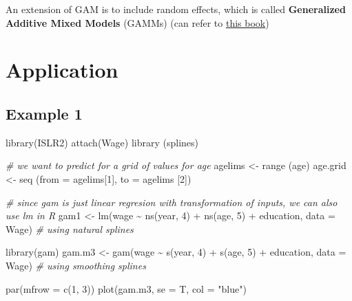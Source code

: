 \documentclass[
]{book}
\newenvironment{Shaded}{\begin{snugshade}}{\end{snugshade}}
\newcommand{\AttributeTok}[1]{\textcolor[rgb]{0.77,0.63,0.00}{#1}}
\newcommand{\CommentTok}[1]{\textcolor[rgb]{0.56,0.35,0.01}{\textit{#1}}}
\newcommand{\DecValTok}[1]{\textcolor[rgb]{0.00,0.00,0.81}{#1}}
\newcommand{\FunctionTok}[1]{\textcolor[rgb]{0.00,0.00,0.00}{#1}}
\newcommand{\NormalTok}[1]{#1}
\newcommand{\OtherTok}[1]{\textcolor[rgb]{0.56,0.35,0.01}{#1}}
\newcommand{\SpecialCharTok}[1]{\textcolor[rgb]{0.00,0.00,0.00}{#1}}
\newcommand{\StringTok}[1]{\textcolor[rgb]{0.31,0.60,0.02}{#1}}
\begin{document}
An extension of GAM is to include random effects, which is called \textbf{Generalized Additive Mixed Models} (GAMMs) (can refer to \href{https://highstat.com/index.php/beginner-s-guide-to-generalized-additive-models-with-r}{this book})

\hypertarget{application-2}{%
\section{Application}\label{application-2}}

\hypertarget{example-1-1}{%
\subsection{Example 1}\label{example-1-1}}

\citep[7.8]{james2013}

\begin{Shaded}
\begin{Highlighting}[]
\FunctionTok{library}\NormalTok{(ISLR2)}
\FunctionTok{attach}\NormalTok{(Wage)}
\FunctionTok{library}\NormalTok{ (splines)}

\CommentTok{\# we want to predict for a grid of values for age }
\NormalTok{agelims }\OtherTok{\textless{}{-}} \FunctionTok{range}\NormalTok{ (age)}
\NormalTok{age.grid }\OtherTok{\textless{}{-}} \FunctionTok{seq}\NormalTok{ (}\AttributeTok{from =}\NormalTok{ agelims[}\DecValTok{1}\NormalTok{], }\AttributeTok{to =}\NormalTok{ agelims [}\DecValTok{2}\NormalTok{])}

\CommentTok{\# since gam is just linear regresion with transformation of inputs, we can also use lm in R}
\NormalTok{gam1 }\OtherTok{\textless{}{-}} \FunctionTok{lm}\NormalTok{(wage }\SpecialCharTok{\textasciitilde{}} \FunctionTok{ns}\NormalTok{(year, }\DecValTok{4}\NormalTok{) }\SpecialCharTok{+} \FunctionTok{ns}\NormalTok{(age, }\DecValTok{5}\NormalTok{) }\SpecialCharTok{+}\NormalTok{ education, }\AttributeTok{data =}\NormalTok{ Wage) }\CommentTok{\# using natural splines}

\FunctionTok{library}\NormalTok{(gam)}
\NormalTok{gam.m3 }\OtherTok{\textless{}{-}}
    \FunctionTok{gam}\NormalTok{(wage }\SpecialCharTok{\textasciitilde{}} \FunctionTok{s}\NormalTok{(year, }\DecValTok{4}\NormalTok{) }\SpecialCharTok{+} \FunctionTok{s}\NormalTok{(age, }\DecValTok{5}\NormalTok{) }\SpecialCharTok{+}\NormalTok{ education, }\AttributeTok{data =}\NormalTok{ Wage) }\CommentTok{\# using smoothing splines}

\FunctionTok{par}\NormalTok{(}\AttributeTok{mfrow =} \FunctionTok{c}\NormalTok{(}\DecValTok{1}\NormalTok{, }\DecValTok{3}\NormalTok{))}
\FunctionTok{plot}\NormalTok{(gam.m3, }\AttributeTok{se =}\NormalTok{ T, }\AttributeTok{col =} \StringTok{"blue"}\NormalTok{)}
\end{Highlighting}
\end{Shaded}
\end{document}
